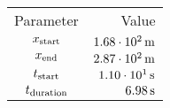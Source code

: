 \begin{tabular}{cr}
    \toprule
    Parameter & Value \\ \otoprule
    $x_{\textup{start}}$    & $\unit[1.68 \cdot 10^{2}]{m}$ \\
    $x_{\textup{end}}$      & $\unit[2.87 \cdot 10^{2}]{m}$ \\
    $t_{\textup{start}}$    & $\unit[1.10 \cdot 10^{1}]{s}$ \\
    $t_{\textup{duration}}$ & $\unit[6.98]{s}$ \\
    \bottomrule
\end{tabular}
